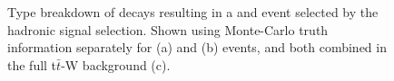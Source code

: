 \begin{figure}[htbp]
\begin{center}






\caption{\label{fig:ttwtype} Type breakdown of decays resulting in a \wj and \ttj event selected by the hadronic signal selection. Shown using Monte-Carlo truth information separately for \wj (a) and \ttj (b) events, and both combined in the full t$\bar{t}$-W background (c). }
\end{center}
\end{figure}


